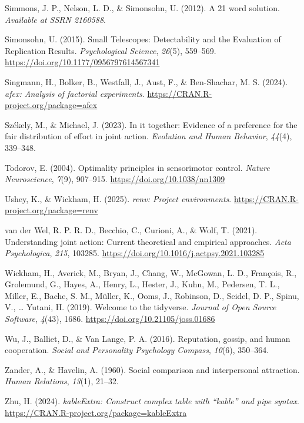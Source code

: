 \documentclass[
  man,
  floatsintext,
  longtable,
  nolmodern,
  notxfonts,
  notimes,
  mask,
  colorlinks=true,linkcolor=blue,citecolor=blue,urlcolor=blue]{apa7}
\newlength{\cslhangindent}
\newenvironment{CSLReferences}[2] %
 {\begin{list}{}{%
  \setlength{\itemindent}{0pt}
  \setlength{\leftmargin}{0pt}
  \setlength{\parsep}{0pt}
  \ifodd #1
   \setlength{\leftmargin}{\cslhangindent}
   \setlength{\itemindent}{-1\cslhangindent}
  \fi
  \setlength{\itemsep}{#2\baselineskip}}}
 {\end{list}}
\begin{document}
\begin{CSLReferences}{1}{0}
Simmons, J. P., Nelson, L. D., \& Simonsohn, U. (2012). A 21 word
solution. \emph{Available at SSRN 2160588}.

Simonsohn, U. (2015). Small {Telescopes}: {Detectability} and the
{Evaluation} of {Replication Results}. \emph{Psychological Science},
\emph{26}(5), 559--569. \url{https://doi.org/10.1177/0956797614567341}

Singmann, H., Bolker, B., Westfall, J., Aust, F., \& Ben-Shachar, M. S.
(2024). \emph{{afex}: Analysis of factorial experiments}.
\url{https://CRAN.R-project.org/package=afex}

Székely, M., \& Michael, J. (2023). In it together: {Evidence} of a
preference for the fair distribution of effort in joint action.
\emph{Evolution and Human Behavior}, \emph{44}(4), 339--348.

Todorov, E. (2004). Optimality principles in sensorimotor control.
\emph{Nature Neuroscience}, \emph{7}(9), 907--915.
\url{https://doi.org/10.1038/nn1309}

Ushey, K., \& Wickham, H. (2025). \emph{{renv}: Project environments}.
\url{https://CRAN.R-project.org/package=renv}

van der Wel, R. P. R. D., Becchio, C., Curioni, A., \& Wolf, T. (2021).
Understanding joint action: {Current} theoretical and empirical
approaches. \emph{Acta Psychologica}, \emph{215}, 103285.
\url{https://doi.org/10.1016/j.actpsy.2021.103285}

Wickham, H., Averick, M., Bryan, J., Chang, W., McGowan, L. D.,
François, R., Grolemund, G., Hayes, A., Henry, L., Hester, J., Kuhn, M.,
Pedersen, T. L., Miller, E., Bache, S. M., Müller, K., Ooms, J.,
Robinson, D., Seidel, D. P., Spinu, V., \ldots{} Yutani, H. (2019).
Welcome to the {tidyverse}. \emph{Journal of Open Source Software},
\emph{4}(43), 1686. \url{https://doi.org/10.21105/joss.01686}

Wu, J., Balliet, D., \& Van Lange, P. A. (2016). Reputation, gossip, and
human cooperation. \emph{Social and Personality Psychology Compass},
\emph{10}(6), 350--364.

Zander, A., \& Havelin, A. (1960). Social comparison and interpersonal
attraction. \emph{Human Relations}, \emph{13}(1), 21--32.

Zhu, H. (2024). \emph{{kableExtra}: Construct complex table with
{``{kable}''} and pipe syntax}.
\url{https://CRAN.R-project.org/package=kableExtra}

\end{CSLReferences}
\end{document}
